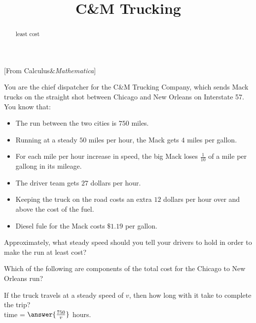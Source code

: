 \documentclass{ximera}
\title{C{\&}M Trucking}
\begin{document}
\begin{abstract}
least cost
\end{abstract}
\maketitle


[From Calculus\&\textit{Mathematica}]




You are the chief dispatcher for the C{\&}M Trucking Company, which sends Mack trucks on the straight shot between Chicago and New Orleans on Interstate 57.  You know that:



\begin{itemize}
\item The run between the two cities is $750$ miles.
\item Running at a steady $50$ miles per hour, the Mack gets $4$ miles per gallon.
\item For each mile per hour increase in speed, the big Mack loses $\frac{1}{10}$ of a mile per gallong in its mileage.
\item The driver team gets $27$ dollars per hour.
\item Keeping the truck on the road costs an extra $12$ dollars per hour over and above the cost of the fuel.
\item Diesel fule for the Mack costs $\$1.19$ per gallon. 
\end{itemize}

Approximately, what steady speed should you tell your drivers to hold in order to make the run at least cost? \\





\begin{question} \boxdot

Which of the following are components of the total cost for the Chicago to New Orleans run?

\begin{selectAll}
\end{selectAll}
\end{question}


\begin{question} \boxdot
If the truck travels at a steady speed of $v$, then how long with it take to complete the trip? \\

time = $\answer{\frac{750}{v}}$ hours.
\end{question}
\end{document}
